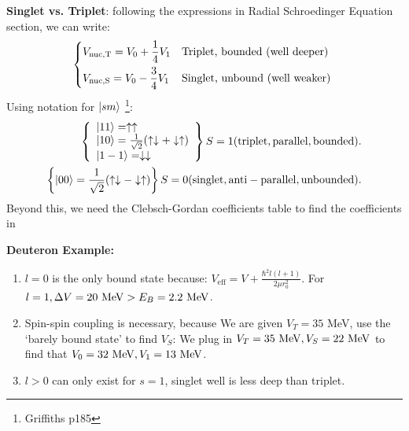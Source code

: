\documentclass{school-22.101-notes}
\begin{document}
\textbf{Singlet vs. Triplet}: following the expressions in Radial Schroedinger Equation section, we can write: 
\begin{align}
\begin{dcases*}
V_{\mathrm{nuc,T}} = V_0 + \frac{1}{4} V_1 & Triplet, bounded (well deeper) \\
V_{\mathrm{nuc,S}} = V_0 - \frac{3}{4} V_1 & Singlet, unbound (well weaker)
\end{dcases*}
\end{align}
Using notation for $\left| s m \right>$ \footnote{Griffiths p185}: 
\begin{align}
\left\{ \begin{array}{l} 
\left| 1 1 \right> = \uparrow \uparrow \\
\left| 1 0 \right> = \frac{1}{\sqrt{2}} (\uparrow \downarrow + \downarrow \uparrow ) \\
\left| 1 -1 \right> = \downarrow \downarrow
\end{array} \right\}
S = 1 (\mathrm{triplet, parallel, bounded}). \\
\left\{ \left| 0 0 \right> = \frac{1}{\sqrt{2}} (\uparrow \downarrow - \downarrow \uparrow ) \right\} 
S = 0 (\mathrm{singlet, anti-parallel, unbounded}).
\end{align}
Beyond this, we need the Clebsch-Gordan coefficients table to find the coefficients in 


\textbf{Deuteron Example:} 
    \begin{enumerate}
    \item $l=0$ is the only bound state because: $V_{\mathrm{eff}} = V + \frac{\hbar^2 l(l+1)}{2 \mu r_0^2}$. 
    For $l=1, \Delta V = 20 \mbox{ } \mathrm{MeV} > E_B = 2.2 \mbox{ } \mathrm{MeV}$.
    \item Spin-spin coupling is necessary, because 
    We are given $V_T = 35$ MeV, use the `barely bound state' to find $V_S$: 
    We plug in $V_T = 35 \mbox{ } \mathrm{MeV}, V_S = 22 \mbox{ } \mathrm{MeV}$ to find that $V_0 = 32 \mbox{ } \mathrm{MeV}, V_1 = 13 \mbox{ } \mathrm{MeV}$. 
    \item $l>0$ can only exist for $s=1$, singlet well is less deep than triplet.     
    \end{enumerate}
\end{document}
